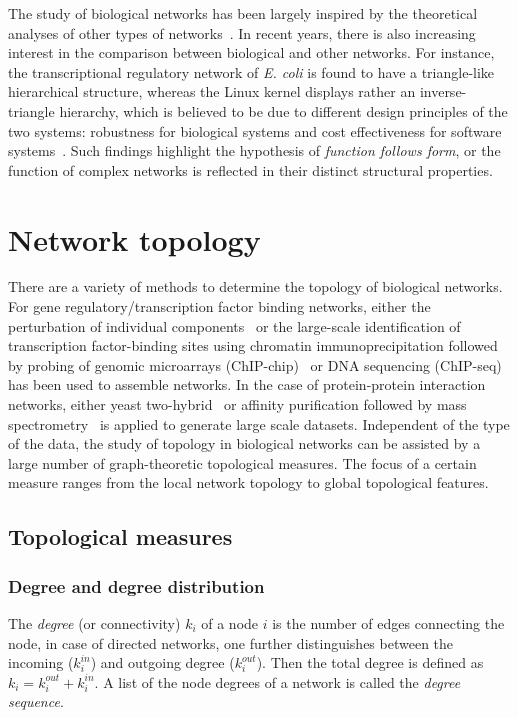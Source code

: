 The study of biological networks has been largely inspired by the theoretical 
analyses of other types of networks~\citep{Barabasi2004}. In recent years, 
there is also increasing interest in the comparison between biological and
other networks. For instance, the transcriptional regulatory network of 
\emph{E. coli} is found to have a triangle-like hierarchical 
structure, whereas the Linux kernel displays rather an inverse-triangle
hierarchy, which is believed to be due to different design principles of the two 
systems: robustness for biological systems and cost effectiveness for 
software systems~\citep{Yan2010}.
Such findings highlight the hypothesis of \emph{function follows form}, or 
the function of complex networks is reflected in their distinct structural 
properties.

\section{Network topology}
There are a variety of methods to determine the topology of biological
networks. For gene regulatory/transcription factor binding networks,
either the perturbation of individual components~\citep{Davidson2002} or
the large-scale identification of transcription factor-binding sites 
using chromatin immunoprecipitation followed by probing of genomic microarrays 
(ChIP-chip)~\citep{Horak2002b} or DNA sequencing (ChIP-seq)~\citep{Johnson2007} 
has been used to assemble networks.
In the case of protein-protein interaction networks, either yeast two-hybrid~%
\citep{Uetz2000,Ito2001}
or affinity purification followed by mass spectrometry~\citep{Gavin2006} is applied to 
generate large scale datasets. 
Independent of the type of the data, the study of topology in biological networks
can be assisted by
a large number of graph-theoretic topological measures.
The focus of a certain measure ranges from the local network topology to 
global topological features.

\subsection{Topological measures}

\subsubsection{Degree and degree distribution}
The \emph{degree} (or connectivity) $k_i$ of a node $i$ is the number of edges 
connecting the node, in case of directed networks, one further distinguishes
between the incoming ($k_i^{in}$) and outgoing degree ($k_i^{out}$). Then the total 
degree is defined as $k_i = k_i^{out} + k_i^{in}$. A list of the node degrees 
of a network is called the \emph{degree sequence}.

